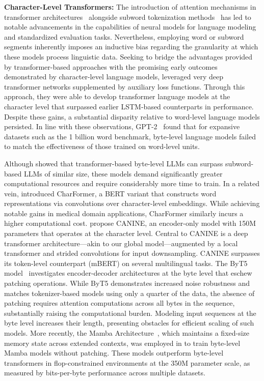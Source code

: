 \textbf{Character-Level Transformers:} The introduction of attention mechanisms in transformer architectures~\citep{vaswani2017attention} alongside subword tokenization methods~\citep{sennrich-etal-2016-neural} has led to notable advancements in the capabilities of neural models for language modeling and standardized evaluation tasks. Nevertheless, employing word or subword segments inherently imposes an inductive bias regarding the granularity at which these models process linguistic data. Seeking to bridge the advantages provided by transformer-based approaches with the promising early outcomes demonstrated by character-level language models, \citet{al2019character} leveraged very deep transformer networks supplemented by auxiliary loss functions. Through this approach, they were able to develop transformer language models at the character level that surpassed earlier LSTM-based counterparts in performance. Despite these gains, a substantial disparity relative to word-level language models persisted. In line with these observations, GPT-2~\citep{radfordgpt2} found that for expansive datasets such as the 1 billion word benchmark, byte-level language models failed to match the effectiveness of those trained on word-level units.

Although \cite{Choe2019BridgingTG} showed that transformer-based byte-level LLMs can surpass subword-based LLMs of similar size, these models demand significantly greater computational resources and require considerably more time to train. In a related vein, \cite{el2020characterbert} introduced CharFormer, a BERT variant that constructs word representations via convolutions over character-level embeddings. While achieving notable gains in medical domain applications, CharFormer similarly incurs a higher computational cost. \cite{clark2022canine} propose CANINE, an encoder-only model with 150M parameters that operates at the character level. Central to CANINE is a deep transformer architecture—akin to our global model—augmented by a local transformer and strided convolutions for input downsampling. CANINE surpasses its token-level counterpart (mBERT) on several multilingual tasks. The ByT5 model~\citep{xue2022byt5} investigates encoder-decoder architectures at the byte level that eschew patching operations. While ByT5 demonstrates increased noise robustness and matches tokenizer-based models using only a quarter of the data, the absence of patching requires attention computations across all bytes in the sequence, substantially raising the computational burden. Modeling input sequences at the byte level increases their length, presenting obstacles for efficient scaling of such models. More recently, the Mamba Architecture~\citep{gu2023mamba}, which maintains a fixed-size memory state across extended contexts, was employed in \cite{wang2024mambabyte} to train byte-level Mamba models without patching. These models outperform byte-level transformers in flop-constrained environments at the 350M parameter scale, as measured by bits-per-byte performance across multiple datasets.

